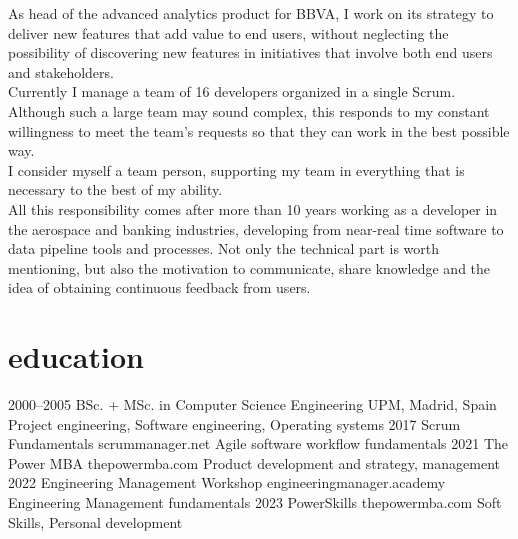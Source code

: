 \documentclass[]{friggeri-cv}
\begin{document}
As {\headingfont head of the advanced analytics product} for BBVA, I work on its strategy to deliver new features that add value to end users, without neglecting the possibility of discovering new features in initiatives that involve both end users and stakeholders. \\
Currently {\headingfont I manage a team of 16 developers} organized in a single Scrum. Although such a large team may sound complex, this responds to my constant willingness to meet the team's requests so that they can work in the best possible way. \\
{\headingfont I consider myself a team person}, supporting my team in everything that is necessary to the best of my ability. \\
{\headingfont All this responsibility comes after more than 10 years working as a developer in the aerospace and banking industries}, developing from near-real time software to data pipeline tools and processes. Not only the technical part is worth mentioning, but also the motivation to communicate, share knowledge and the idea of obtaining continuous feedback from users. \\


\section{education}

\begin{entrylist}
\entry
{2000--2005}
{BSc. + MSc. {\normalfont in Computer Science Engineering}}
{UPM, Madrid, Spain}
{Project engineering, Software engineering, Operating systems}
\entry
{2017}
{{\normalfont Scrum Fundamentals}}
{scrummanager.net}
{Agile software workflow fundamentals}
\entry
{2021}
{{\normalfont The Power MBA}}
{thepowermba.com}
{Product development and strategy, management}
\entry
{2022}
{{\normalfont Engineering Management Workshop}}
{engineeringmanager.academy}
{Engineering Management fundamentals}
\entry
{2023}
{{\normalfont PowerSkills}}
{thepowermba.com}
{Soft Skills, Personal development}

\end{entrylist}
\end{document}
